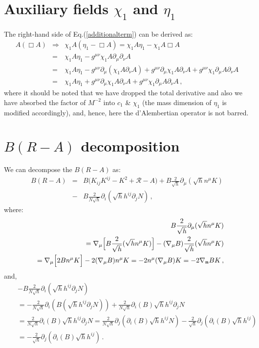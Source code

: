 \documentclass[a4paper,12pt]{article}
\newcommand{\bn}{\bold{n}}
\newcommand{\+}{^{\dagger}}
\newcommand{\2}{\frac{1}{2}}
\newcommand{\3}{\frac{1}{3}}
\newcommand{\4}{\frac{1}{4}}
\newcommand{\6}{\frac{1}{6}}
\newcommand{\8}{\frac{1}{8}}
\begin{document}


\section{Auxiliary fields $\chi_1$ and $\eta_1$}\label{app1}
The right-hand side of Eq.(\ref{additionalterm}) can be derived as: 
\begin{eqnarray}
A(\Box A)&\Rightarrow&\chi_1 A(\eta_1-\Box A)=\chi_1 A\eta_1-\chi_1 A\Box A \nonumber\\
&=&\chi_1 A\eta_1-g^{\mu\nu}\chi_1 A\partial_\mu \partial_\nu A\nonumber\\&=&\chi_1 A\eta_1-g^{\mu\nu}\partial_\mu(\chi_1
A \partial_\nu A)+g^{\mu\nu}\partial_\mu\chi_1 A \partial_\nu A+g^{\mu\nu}\chi_1
\partial_\mu A
\partial_\nu A\nonumber\\
&=&\chi_1 A\eta_1+g^{\mu\nu}\partial_\mu\chi_1 A \partial_\nu A+g^{\mu\nu}\chi_1
\partial_\mu A
\partial_\nu A \,,
\end{eqnarray}
where it should be noted that we have dropped the total derivative and also we have absorbed the factor of $M^{-2}$ into $c_1$ \& $\chi_1$ (the mass dimension of $\eta_1$ is modified accordingly), and, hence, here the d'Alembertian operator is not barred.
  
\section{$B(R-A)$ decomposition}\label{app2}
We can decompose the $B(R-A)$ as: 
\begin{eqnarray}
B(R-A)
&=&B\Big(K_{ij}K^{ij}-K^2+\mathcal{R}-A\Big)+B\frac{2}{\sqrt{h}}\partial_\mu(\sqrt{h}n^\mu
K)\nonumber\\&-&B\frac{2}{N\sqrt{h}}\partial_i(\sqrt{h}h^{ij}\partial_j N)\,,
\end{eqnarray}
where: 
\begin{eqnarray}
&&B\frac{2}{\sqrt{h}}\partial_\mu(\sqrt{h}n^\mu
K)\\\nonumber &&=\nabla_\mu\Big[B\frac{2}{\sqrt{h}}(\sqrt{h}n^\mu
K)\Big]-(\nabla_\mu B)\frac{2}{\sqrt{h}}(\sqrt{h}n^\mu
K)\\\nonumber &&=\nabla_\mu\Big[2Bn^\mu
K\Big]-2(\nabla_\mu B)n^\mu
K=-2n^\mu(\nabla_\mu B)K=-2\nabla_\bn BK\,,
\end{eqnarray}
and,
\begin{eqnarray}
&&-B\frac{2}{N\sqrt{h}}\partial_i(\sqrt{h}h^{ij}\partial_j N)\\ \nonumber&&=-\frac{2}{N\sqrt{h}}\partial_i(B(\sqrt{h}h^{ij}\partial_j
N))+\frac{2}{N\sqrt{h}}\partial_i(B)\sqrt{h}h^{ij}\partial_j
N\\\nonumber
&&=\frac{2}{N\sqrt{h}}\partial_i(B)\sqrt{h}h^{ij}\partial_j
N=\frac{2}{N\sqrt{h}}\partial_j(\partial_i(B)\sqrt{h}h^{ij}
N)-\frac{2}{\sqrt{h}}\partial_j(\partial_i(B)\sqrt{h}h^{ij}
)\\\nonumber
&&=-\frac{2}{\sqrt{h}}\partial_j(\partial_i(B)\sqrt{h}h^{ij}
)\,.
\end{eqnarray}
\end{document}
